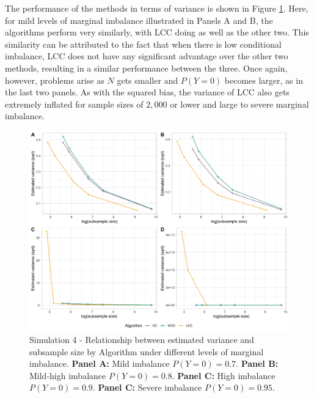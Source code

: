The performance of the methods in terms of variance is shown in Figure \ref{fig:all_vars}. Here, for mild levels of marginal imbalance illustrated in Panels A and B, the algorithms perform very similarly, with LCC doing as well as the other two. This similarity can be attributed to the fact that when there is low conditional imbalance, LCC does not have any significant advantage over the other two methods, resulting in a similar performance between the three. Once again, however, problems arise as $N$ gets smaller and $P(Y=0)$ becomes larger, as in the last two panels. As with the squared bias, the variance of LCC also gets extremely inflated for sample sizes of $2,000$ or lower and large to severe marginal imbalance. \\

\begin{figure}[ht]
    \centering
    \includegraphics[width=\textwidth]{2_Figures/all_var_smallk.png}
    \caption[Simulation 4 - Relationship between empirical variance and subsample size by method]{Simulation 4 - Relationship between estimated variance and subsample size by Algorithm under different levels of marginal imbalance.
    \textbf{Panel A:} Mild imbalance $P(Y=0)=0.7$.
    \textbf{Panel B:} Mild-high imbalance $P(Y=0)=0.8$.
    \textbf{Panel C:} High imbalance $P(Y=0)=0.9$.
    \textbf{Panel C:} Severe imbalance $P(Y=0)=0.95$.}
    \label{fig:all_vars}
\end{figure}

